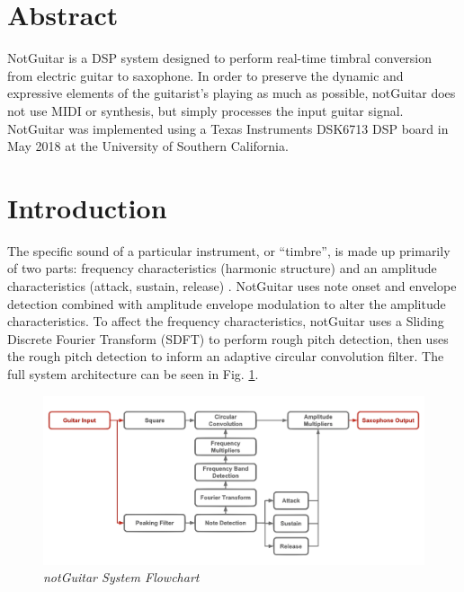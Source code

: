 \documentclass[twoside,a4paper]{article}
\title{\papertitle}
\newif\ifpdf
\begin{document}
\ifpdf %
  \DeclareGraphicsExtensions{.png,.jpg,.pdf}
\else  %
\fi

\maketitle
\section{Abstract}
NotGuitar is a DSP system designed to perform real-time timbral conversion from electric guitar to saxophone.
In order to preserve the dynamic and expressive elements of the guitarist's playing as much as possible,
notGuitar does not use MIDI or synthesis, but simply processes the input guitar signal. 
NotGuitar was implemented using a Texas Instruments DSK6713 DSP board in May 2018 at the University of
Southern California.

\section{Introduction}
The specific sound of a particular instrument, or ``timbre'', is made up primarily of two parts: frequency characteristics
(harmonic structure) and an amplitude characteristics (attack, sustain, release)
\cite{Zolzer:2011:DDA:2028616}. NotGuitar uses note onset and envelope detection combined with
amplitude envelope modulation to alter the amplitude characteristics.
To affect the frequency characteristics, notGuitar uses a Sliding Discrete Fourier Transform (SDFT)
to perform rough pitch detection, then uses the rough pitch detection
to inform an adaptive circular convolution filter.
The full system architecture can be seen in Fig. \ref{flowchart}.

\begin{figure}[ht]
  \center
  \includegraphics[width=5in]{Pictures/FlowChart.png}
  \caption{\label{flowchart}{\it notGuitar System Flowchart}}
  \end{figure}
\end{document}
